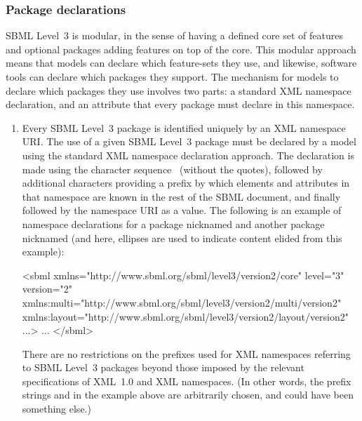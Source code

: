 \subsubsection{Package declarations}
\label{sec:sbml-packages}

SBML Level~3 is modular, in the sense of having a defined core set
of features and optional packages adding features on top of the
core.  This modular approach means that models can declare which
feature-sets they use, and likewise, software tools can declare
which packages they support.  The mechanism for models to declare
which packages they use involves two parts: a standard XML
namespace declaration, and an attribute that every package must
declare in this namespace.
\begin{enumerate}

\item Every SBML Level~3 package is identified uniquely by an XML
  namespace URI.  The use of a given SBML Level~3 package must be
  declared by a model using the standard XML namespace declaration
  approach.  The declaration is made using the character sequence
  \ (without the quotes), followed by additional
  characters providing a prefix by which elements and attributes
  in that namespace are known in the rest of the SBML document,
  and finally followed by the namespace URI as a value.  The
  following is an example of namespace declarations for a package
  nicknamed  and another package nicknamed 
  (and here, ellipses are used to indicate content elided from
  this example):

  \begin{blockChanged}
  \begin{example}
<sbml xmlns="http://www.sbml.org/sbml/level3/version2/core" level="3" version="2"
      xmlns:multi="http://www.sbml.org/sbml/level3/version2/multi/version2"
      xmlns:layout="http://www.sbml.org/sbml/level3/version2/layout/version2" ...>
  ...  
</sbml>\end{example}
  \end{blockChanged}
  There are no restrictions on the prefixes used for XML namespaces
  referring to SBML Level~3 packages beyond those imposed by the
  relevant specifications of XML~1.0 and XML namespaces.  (In other
  words, the prefix strings  and  in the
  example above are arbitrarily chosen, and could have been
  something else.)


\end{enumerate}

